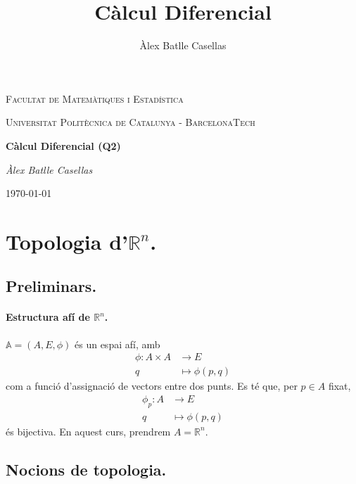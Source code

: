 \documentclass[11pt]{article}
\title{Càlcul Diferencial}
\author{Àlex Batlle Casellas}
\begin{document}
\begin{titlepage}
	\centering
	{\scshape\LARGE Facultat de Matemàtiques i Estadística \par}
	\vspace{1cm}
	{\scshape\Large Universitat Politècnica de Catalunya - BarcelonaTech\par}
	\vspace{1.5cm}
	{\huge\bfseries Càlcul Diferencial (Q2)
	\par}
	\vspace{2cm}
	{\Large\itshape Àlex Batlle Casellas\par}

	\vfill

	{\large \today\par}
\end{titlepage}


\vfill
\newpage\tableofcontents
\newpage
\section{Topologia d'$\mathbb{R}^n$.}
\subsection*{Preliminars.}
\paragraph{Estructura afí de $\mathbb{R}^n$.}
$\mathbb{A}=(A,E,\phi)$ és un espai afí, amb
\begin{align*}
		\phi \colon A\times A &\to E\\
		q &\mapsto \phi(p,q)
\end{align*}
com a funció d'assignació de vectors entre dos punts. Es té que, per $p\in A$ fixat,
\begin{align*}
		\phi_p \colon A &\to E\\
		q &\mapsto \phi(p,q)
\end{align*}
és bijectiva. En aquest curs, prendrem $A=\mathbb{R}^n$.
\newpage
\subsection{Nocions de topologia.}
\end{document}
